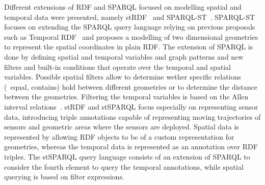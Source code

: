 Different extensions of \ac{RDF} and SPARQL focused on modelling spatial and temporal data were presented, namely
stRDF~\cite{KoubarakisKyzirakos:2010aa} and SPARQL-ST~\cite{PerryJainSheth:2011aa}.
%
SPARQL-ST focuses on extending the SPARQL query language relying on previous proposals such as Temporal
\ac{RDF}~\cite{GutierrezHurtadoVaisman:2007aa} and proposes a modelling of two dimensional geometries to represent the
spatial coordinates in plain \ac{RDF}.
%
The extension of SPARQL is done by defining spatial and temporal variables and graph patterns and new filters and
built-in conditions that operate over the temporal and spatial variables.  Possible spatial filters allow to determine
wether specific relations (\eg~equal, contains) hold between different geometries or to determine the distance between
the geometries.
% 
Filtering the temporal variables is based on the Allen interval relations~\cite{Allen:1983aa}.
%
stRDF and stSPARQL focus especially on representing sensor data, introducing triple annotations capable of representing
moving trajectories of sensors and geometric areas where the sensors are deployed.  Spatial data is represented by
allowing \ac{RDF} objects to be of a custom representation for geometries, whereas the temporal data is represented as
an annotation over \ac{RDF} triples.  
%
The stSPARQL query language consists of an extension of SPARQL to consider the fourth element to query the temporal
annotations, while spatial querying is based on filter expressions.

